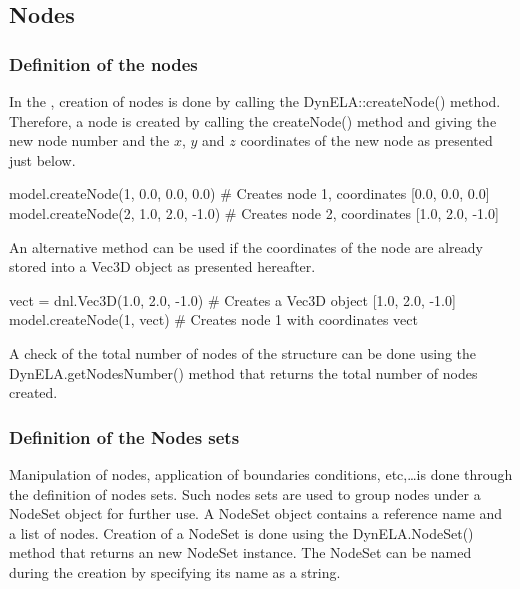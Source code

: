 \subsection{Nodes}

\subsubsection{Definition of the nodes}

In the \DynELA, creation of nodes is done by calling the \textsf{DynELA::createNode()} method. Therefore, a node is created by calling the \textsf{createNode()} method and giving the new node number and the $x$, $y$ and $z$ coordinates of the new node as presented just below.

\begin{PythonListing}
model.createNode(1, 0.0, 0.0, 0.0)  # Creates node 1, coordinates [0.0, 0.0, 0.0]
model.createNode(2, 1.0, 2.0, -1.0) # Creates node 2, coordinates [1.0, 2.0, -1.0]
\end{PythonListing}

An alternative method can be used if the coordinates of the node are already stored into a Vec3D object as presented hereafter.

\begin{PythonListing}
vect = dnl.Vec3D(1.0, 2.0, -1.0) # Creates a Vec3D object [1.0, 2.0, -1.0]
model.createNode(1, vect)        # Creates node 1 with coordinates vect
\end{PythonListing}

A check of the total number of nodes of the structure can be done using the \textsf{DynELA.getNodesNumber()} method that returns the total number of nodes created.

\subsubsection{Definition of the Nodes sets}

Manipulation of nodes, application of boundaries conditions, etc,\ldots is done through the definition of nodes sets. Such nodes sets are used to group nodes under a \textsf{NodeSet} object for further use. A \textsf{NodeSet} object contains a reference name and a list of nodes. Creation of a \textsf{NodeSet} is done using the \textsf{DynELA.NodeSet()} method that returns an new \textsf{NodeSet} instance. The \textsf{NodeSet} can be named during the creation by specifying its name as a string.

